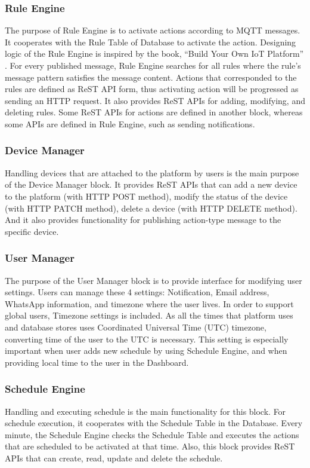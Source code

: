 \documentclass[conference]{IEEEtran}
\begin{document}
\subsubsection{Rule Engine}
\hfill \break The purpose of Rule Engine is to activate actions according to MQTT messages. It cooperates with the Rule Table of Database to activate the action. Designing logic of the Rule Engine is inspired by the book, “Build Your Own IoT Platform” \cite{b25}. For every published message, Rule Engine searches for all rules where the rule's message pattern satisfies the message content. Actions that corresponded to the rules are defined as ReST API form, thus activating action will be progressed as sending an HTTP request. It also provides ReST APIs for adding, modifying, and deleting rules. Some ReST APIs for actions are defined in another block, whereas some APIs are defined in Rule Engine, such as sending notifications.

\subsubsection{Device Manager}
\hfill \break Handling devices that are attached to the platform by users is the main purpose of the Device Manager block. It provides ReST APIs that can add a new device to the platform (with HTTP POST method), modify the status of the device (with HTTP PATCH method), delete a device (with HTTP DELETE method). And it also provides functionality for publishing action-type message to the specific device.

\subsubsection{User Manager}
\hfill \break The purpose of the User Manager block is to provide interface for modifying user settings. Users can manage these 4 settings: Notification, Email address, WhatsApp information, and timezone where the user lives.  In order to support global users, Timezone settings is included. As all the times that platform uses and database stores uses Coordinated Universal Time (UTC) timezone, converting time of the user to the UTC is necessary. This setting is especially important when user adds new schedule by using Schedule Engine, and when providing local time to the user in the Dashboard.

\subsubsection{Schedule Engine}
\hfill \break Handling and executing schedule is the main functionality for this block. For schedule execution, it cooperates with the Schedule Table in the Database. Every minute, the Schedule Engine checks the Schedule Table and executes the actions that are scheduled to be activated at that time. Also, this block provides ReST APIs that can create, read, update and delete the schedule.
\end{document}
